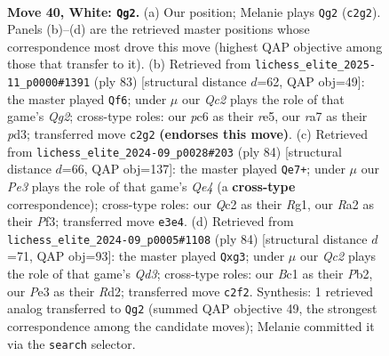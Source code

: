 \documentclass[11pt]{article}
\begin{document}
\clearpage

\begin{figure}[p]\centering
\begin{subfigure}{0.46\textwidth}\centering
\resizebox{\linewidth}{!}{%
\newchessgame
\chessboard[
  setfen={7r/r3k3/1pp3p1/3qp1p1/Pp1P4/3KP3/R1Q5/2B5 w - - 0 40},
  showmover=false,
  pgfstyle=straightmove, color=movearrow, markmove={c2-g2}
]}
\caption{}
\end{subfigure}\hfill
\begin{subfigure}{0.46\textwidth}\centering
\resizebox{\linewidth}{!}{%
\newchessgame
\chessboard[
  setfen={8/3r2q1/6pk/p3R3/1p1p2QP/1P1P4/P1P3K1/8 b - - 0 42},
  showmover=false,
  pgfstyle=straightmove, color=movearrow, markmove={g7-f6}
]}
\caption{}
\end{subfigure}
\\[4pt]
\begin{subfigure}{0.46\textwidth}\centering
\resizebox{\linewidth}{!}{%
\newchessgame
\chessboard[
  setfen={8/1p4k1/p4p2/P2P2rp/4Q3/1P3Pqp/6P1/6RK w - - 0 43},
  showmover=false,
  pgfstyle=straightmove, color=movearrow, markmove={e4-e7}
]}
\caption{}
\end{subfigure}\hfill
\begin{subfigure}{0.46\textwidth}\centering
\resizebox{\linewidth}{!}{%
\newchessgame
\chessboard[
  setfen={2q3k1/5p2/6p1/3P4/1pP2r2/3Q2pP/1P1R1P2/5K2 w - - 0 43},
  showmover=false,
  pgfstyle=straightmove, color=movearrow, markmove={d3-g3}
]}
\caption{}
\end{subfigure}
\caption{\textbf{Move 40, White: \texttt{Qg2}.} (a) Our position; Melanie plays \texttt{Qg2} (\texttt{c2g2}). Panels (b)--(d) are the retrieved master positions whose correspondence most drove this move (highest QAP objective among those that transfer to it). (b) Retrieved from \texttt{lichess\_elite\_2025-11\_p0000\#1391} (ply 83) [structural distance $d$=62, QAP obj=49]: the master played \texttt{Qf6}; under $\mu$ our \emph{Qc2} plays the role of that game's \emph{Qg2}; cross-type roles: our \emph{p}c6 as their \emph{r}e5, our \emph{r}a7 as their \emph{p}d3; transferred move \texttt{c2g2} \textbf{(endorses this move)}. (c) Retrieved from \texttt{lichess\_elite\_2024-09\_p0028\#203} (ply 84) [structural distance $d$=66, QAP obj=137]: the master played \texttt{Qe7+}; under $\mu$ our \emph{Pe3} plays the role of that game's \emph{Qe4} (a \textbf{cross-type} correspondence); cross-type roles: our \emph{Q}c2 as their \emph{R}g1, our \emph{R}a2 as their \emph{P}f3; transferred move \texttt{e3e4}. (d) Retrieved from \texttt{lichess\_elite\_2024-09\_p0005\#1108} (ply 84) [structural distance $d$=71, QAP obj=93]: the master played \texttt{Qxg3}; under $\mu$ our \emph{Qc2} plays the role of that game's \emph{Qd3}; cross-type roles: our \emph{B}c1 as their \emph{P}b2, our \emph{P}e3 as their \emph{R}d2; transferred move \texttt{c2f2}. Synthesis: 1 retrieved analog transferred to \texttt{Qg2} (summed QAP objective 49, the strongest correspondence among the candidate moves); Melanie committed it via the \texttt{search} selector.}
\label{fig:thought-m78}
\end{figure}
\end{document}
